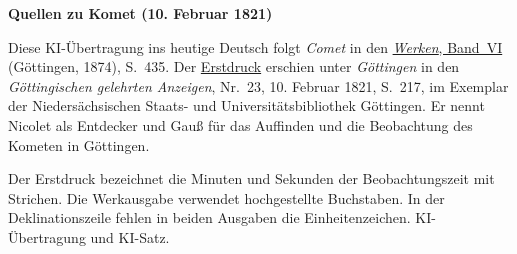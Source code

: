 \clearpage\thispagestyle{empty}
\begin{center}\textbf{Quellen zu Komet (10. Februar 1821)}\end{center}
\noindent Diese KI-Übertragung ins heutige Deutsch folgt \textit{Comet} in den \href{https://gdz.sub.uni-goettingen.de/id/PPN236007467}{\textit{Werken}, Band~VI} (Göttingen, 1874), S.~435. Der \href{https://images.p.sub.uni-goettingen.de/iiif/image/gdz:PPN319721507_1821:00000217/full/1600,/0/default.jpg}{Erstdruck} erschien unter \textit{Göttingen} in den \textit{Göttingischen gelehrten Anzeigen}, Nr.~23, 10. Februar 1821, S.~217, im Exemplar der Niedersächsischen Staats- und Universitätsbibliothek Göttingen. Er nennt Nicolet als Entdecker und Gauß für das Auffinden und die Beobachtung des Kometen in Göttingen.
\par\smallskip\noindent Der Erstdruck bezeichnet die Minuten und Sekunden der Beobachtungszeit mit Strichen. Die Werkausgabe verwendet hochgestellte Buchstaben. In der Deklinationszeile fehlen in beiden Ausgaben die Einheitenzeichen. KI-Übertragung und KI-Satz.
\clearpage
